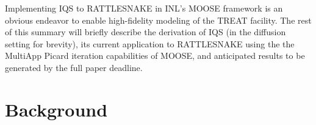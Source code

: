 \documentclass[12pt]{article}
\begin{document}
Implementing IQS to RATTLESNAKE in INL's MOOSE framework is an obvious endeavor to enable high-fidelity modeling of the TREAT facility. The rest of this summary will briefly describe the derivation of IQS (in the diffusion setting for brevity), its current application to RATTLESNAKE using the the MultiApp Picard iteration capabilities of MOOSE, and anticipated results to be generated by the full paper deadline.



%
\section{Background}
\label{sect::background}
\end{document}

